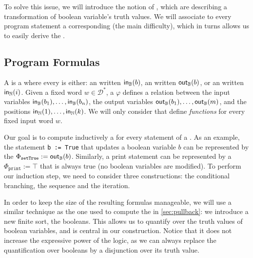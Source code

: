 To solve this issue, we will introduce the notion of ,
which are  describing a transformation of boolean
variable's truth values. We will associate to every program statement a
corresponding  (the main difficulty), which in turns allows
us to easily derive the .



\subsection{Program Formulas}
\label{sec:program-formulas}

\AP A  is a  where every
 is either: an   written
$\mathsf{in}_{\mathbb{B}}(b)$,  an  written $\mathsf{out}_{\mathbb{B}}(b)$, or an
 written $\mathsf{in}_{\mathbb{N}}(i)$. Given a fixed word $w \in
\mathcal{D}^*$, a  $\varphi$ defines a relation between the
input variables $\mathsf{in}_{\mathbb{B}}(b_1), \dots, \mathsf{in}_{\mathbb{B}}(b_n)$, the output variables
$\mathsf{out}_{\mathbb{B}}(b_1), \dots, \mathsf{out}_{\mathbb{B}}(m)$, and the positions $\mathsf{in}_{\mathbb{N}}(1), \dots,
\mathsf{in}_{\mathbb{N}}(k)$. We will only consider  that define
\emph{functions} for every fixed input word $w$.


Our goal is to compute inductively a  for every statement
of a . As an example, the statement \texttt{b := True}
that updates a boolean variable $b$ can be represented by the  $\Phi_{\texttt{setTrue}} := \mathsf{out}_{\mathbb{B}}(b)$. Similarly, a print statement
can be represented by a  $\Phi_{\texttt{print}} := \top$
that is always true (no boolean variables are modified). To perform our
induction step, we need to consider three constructions: the conditional
branching, the sequence and the iteration.

In order to keep the size of the resulting formulas manageable, we will use a
similar technique as the one used to compute the  in
\cref{sec:pullback}: we introduce
a new finite sort, the booleans. This allows us to quantify over the truth
values of boolean variables, and is central in our construction. Notice that it
does not increase the expressive power of the logic, as we can always replace
the quantification over booleans by a disjunction over its truth value.

